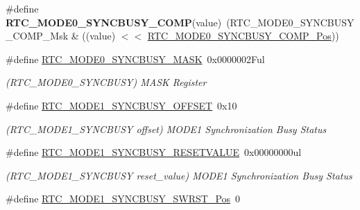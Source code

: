 \begin{DoxyCompactItemize}
\item 
\hypertarget{group___s_a_m_l21___r_t_c_ga41aed43ce3898cc7bf36c01f88c0d8a9}{}\#define {\bfseries R\+T\+C\+\_\+\+M\+O\+D\+E0\+\_\+\+S\+Y\+N\+C\+B\+U\+S\+Y\+\_\+\+C\+O\+M\+P}(value)~(R\+T\+C\+\_\+\+M\+O\+D\+E0\+\_\+\+S\+Y\+N\+C\+B\+U\+S\+Y\+\_\+\+C\+O\+M\+P\+\_\+\+Msk \& ((value) $<$$<$ \hyperlink{group___s_a_m_l21___r_t_c_gafb604affc2cb42251adf429240458e83}{R\+T\+C\+\_\+\+M\+O\+D\+E0\+\_\+\+S\+Y\+N\+C\+B\+U\+S\+Y\+\_\+\+C\+O\+M\+P\+\_\+\+Pos}))\label{group___s_a_m_l21___r_t_c_ga41aed43ce3898cc7bf36c01f88c0d8a9}

\item 
\hypertarget{group___s_a_m_l21___r_t_c_ga8eb3ac9bdeafd4454e1086d2ac0bde3c}{}\#define \hyperlink{group___s_a_m_l21___r_t_c_ga8eb3ac9bdeafd4454e1086d2ac0bde3c}{R\+T\+C\+\_\+\+M\+O\+D\+E0\+\_\+\+S\+Y\+N\+C\+B\+U\+S\+Y\+\_\+\+M\+A\+S\+K}~0x0000002\+Ful\label{group___s_a_m_l21___r_t_c_ga8eb3ac9bdeafd4454e1086d2ac0bde3c}

\begin{DoxyCompactList}\small\item\em (R\+T\+C\+\_\+\+M\+O\+D\+E0\+\_\+\+S\+Y\+N\+C\+B\+U\+S\+Y) M\+A\+S\+K Register \end{DoxyCompactList}\item 
\hypertarget{group___s_a_m_l21___r_t_c_ga6cb2e49f6ee2f96e935f63972f638fa4}{}\#define \hyperlink{group___s_a_m_l21___r_t_c_ga6cb2e49f6ee2f96e935f63972f638fa4}{R\+T\+C\+\_\+\+M\+O\+D\+E1\+\_\+\+S\+Y\+N\+C\+B\+U\+S\+Y\+\_\+\+O\+F\+F\+S\+E\+T}~0x10\label{group___s_a_m_l21___r_t_c_ga6cb2e49f6ee2f96e935f63972f638fa4}

\begin{DoxyCompactList}\small\item\em (R\+T\+C\+\_\+\+M\+O\+D\+E1\+\_\+\+S\+Y\+N\+C\+B\+U\+S\+Y offset) M\+O\+D\+E1 Synchronization Busy Status \end{DoxyCompactList}\item 
\hypertarget{group___s_a_m_l21___r_t_c_gab1238ff6dd55f86857b6b0bdcdf6bc5c}{}\#define \hyperlink{group___s_a_m_l21___r_t_c_gab1238ff6dd55f86857b6b0bdcdf6bc5c}{R\+T\+C\+\_\+\+M\+O\+D\+E1\+\_\+\+S\+Y\+N\+C\+B\+U\+S\+Y\+\_\+\+R\+E\+S\+E\+T\+V\+A\+L\+U\+E}~0x00000000ul\label{group___s_a_m_l21___r_t_c_gab1238ff6dd55f86857b6b0bdcdf6bc5c}

\begin{DoxyCompactList}\small\item\em (R\+T\+C\+\_\+\+M\+O\+D\+E1\+\_\+\+S\+Y\+N\+C\+B\+U\+S\+Y reset\+\_\+value) M\+O\+D\+E1 Synchronization Busy Status \end{DoxyCompactList}\item 
\hypertarget{group___s_a_m_l21___r_t_c_ga66777ce59a06d57f2f2fd3fe60c3a6fb}{}\#define \hyperlink{group___s_a_m_l21___r_t_c_ga66777ce59a06d57f2f2fd3fe60c3a6fb}{R\+T\+C\+\_\+\+M\+O\+D\+E1\+\_\+\+S\+Y\+N\+C\+B\+U\+S\+Y\+\_\+\+S\+W\+R\+S\+T\+\_\+\+Pos}~0\label{group___s_a_m_l21___r_t_c_ga66777ce59a06d57f2f2fd3fe60c3a6fb}


\end{DoxyCompactItemize}

